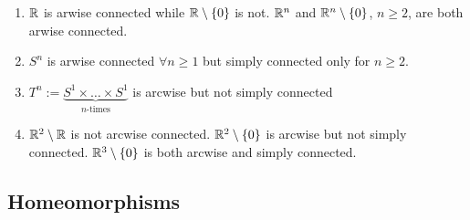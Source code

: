 \documentclass[../main/main.tex]{subfiles}
\begin{document}
\begin{es}
\begin{enumerate}[label=(\alph*)]
\item $\mathbb R$ is arwise connected while $\mathbb R\setminus\{0\}$ is not. $\mathbb R^n$ and $\mathbb R^n\setminus\{0\}$, $n\geq2$, are both arwise connected.
\item $S^n$ is arwise connected $\forall n\geq 1$ but simply connected only for $n\geq 2$.
\item $T^n:=\underbrace{S^1\times\dots\times S^1}_{\text{$n$-times}}$ is arcwise but not simply connected
\item
$\mathbb R^2\setminus\mathbb R$ is not arcwise connected. $\mathbb R^2\setminus\{0\}$ is arcwise but not simply connected. $\mathbb R^3\setminus\{0\}$ is both arcwise and simply connected.
\end{enumerate}
\end{es}

\subsection{Homeomorphisms}
\end{document}
